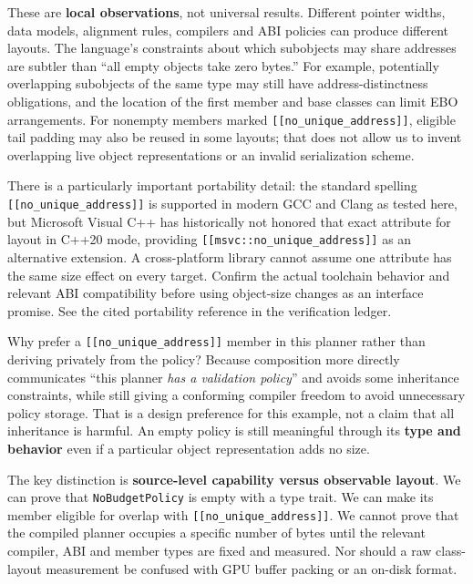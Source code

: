 These are \textbf{local observations}, not universal results. Different pointer widths, data models, alignment rules, compilers and ABI policies can produce different layouts. The language's constraints about which subobjects may share addresses are subtler than ``all empty objects take zero bytes.'' For example, potentially overlapping subobjects of the same type may still have address-distinctness obligations, and the location of the first member and base classes can limit EBO arrangements. For nonempty members marked \texttt{{[}{[}no\_unique\_address{]}{]}}, eligible tail padding may also be reused in some layouts; that does not allow us to invent overlapping live object representations or an invalid serialization scheme.

There is a particularly important portability detail: the standard spelling \texttt{{[}{[}no\_unique\_address{]}{]}} is supported in modern GCC and Clang as tested here, but Microsoft Visual C++ has historically not honored that exact attribute for layout in C++20 mode, providing \texttt{{[}{[}msvc::no\_unique\_address{]}{]}} as an alternative extension. A cross-platform library cannot assume one attribute has the same size effect on every target. Confirm the actual toolchain behavior and relevant ABI compatibility before using object-size changes as an interface promise. See the cited portability reference in the verification ledger.

Why prefer a \texttt{{[}{[}no\_unique\_address{]}{]}} member in this planner rather than deriving privately from the policy? Because composition more directly communicates ``this planner \emph{has a validation policy}'' and avoids some inheritance constraints, while still giving a conforming compiler freedom to avoid unnecessary policy storage. That is a design preference for this example, not a claim that all inheritance is harmful. An empty policy is still meaningful through its \textbf{type and behavior} even if a particular object representation adds no size.

The key distinction is \textbf{source-level capability versus observable layout}. We can prove that \texttt{NoBudgetPolicy} is empty with a type trait. We can make its member eligible for overlap with \texttt{{[}{[}no\_unique\_address{]}{]}}. We cannot prove that the compiled planner occupies a specific number of bytes until the relevant compiler, ABI and member types are fixed and measured. Nor should a raw class-layout measurement be confused with GPU buffer packing or an on-disk format.

